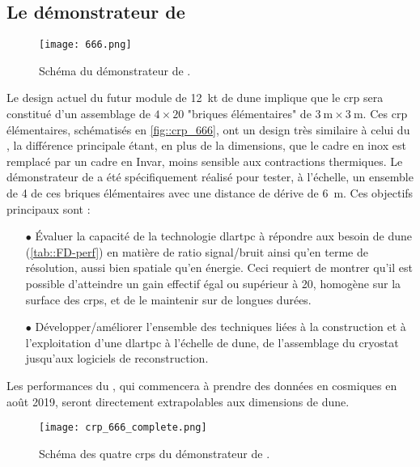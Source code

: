     \subsection{Le démonstrateur de \SSS{}}

      \begin{figure}[htbp]
        \begin{center}\texttt{[image: 666.png]}\end{center}
        \caption[Schéma du démonstrateur de \SSS{}.]{\label{fig::666}Schéma du démonstrateur de \SSS{}.}
      \end{figure}

      Le design actuel du futur module de \SI{12}{\kilo\tonne}\cite{Acciarri2016a} de \gls{dune} implique que le \gls{crp} sera constitué d'un assemblage de $4\times20$ "briques élémentaires" de $\SI{3}{\meter}\times\SI{3}{\meter}$. Ces \gls{crp} élémentaires, schématisés en \autoref{fig::crp_666}, ont un design très similaire à celui du \TOO{}, la différence principale étant, en plus de la dimensions, que le cadre en inox est remplacé par un cadre en Invar, moins sensible aux contractions thermiques. Le démonstrateur de \SSS{} a été spécifiquement réalisé pour tester, à l'échelle, un ensemble de 4 de ces briques élémentaires avec une distance de dérive de \SI{6}{\meter}. Ces objectifs principaux sont :
      \begin{itemize}
        \item[$\bullet$] Évaluer la capacité de la technologie \gls{dlartpc} à répondre aux besoin de \gls{dune} (\autoref{tab::FD-perf}) en matière de ratio signal/bruit ainsi qu'en terme de résolution, aussi bien spatiale qu'en énergie. Ceci requiert de montrer qu'il est possible d'atteindre un gain effectif égal ou supérieur à 20, homogène sur la surface des \glspl{crp}, et de le maintenir sur de longues durées.
        \item[$\bullet$] Développer/améliorer l'ensemble des techniques liées à la construction et à l'exploitation d'une \gls{dlartpc} à l'échelle de \gls{dune}, de l'assemblage du cryostat jusqu'aux logiciels de reconstruction.
      \end{itemize}
      Les performances du \SSS{}, qui commencera à prendre des données en cosmiques en août 2019, seront directement extrapolables aux dimensions de \gls{dune}.

      \begin{figure}[htbp]
        \begin{center}\texttt{[image: crp\_666\_complete.png]}\end{center}
        \caption[Schéma des CRPs du \SSS{}.]{\label{fig::crp_666}Schéma des quatre \glspl{crp} du démonstrateur de \SSS{}.}
      \end{figure}

